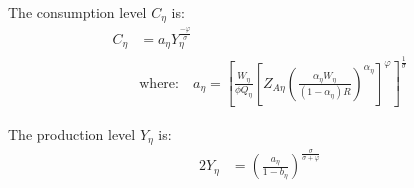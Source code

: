 \documentclass[../thesis.tex]{subfiles}
\begin{document}

The consumption level $C_{\eta}$ is:	
	\begin{align}
		C_{\eta} &= a_{\eta} Y_{\eta}^{\frac{-\varphi}{\sigma}} \label{eq_v2:reg-ss-consumption} \\
		& \text{where:} \quad a_{\eta} = \left[ \frac{W_{\eta}}{\phi Q_{\eta}} \left[ Z_{A\eta} \left( \frac{\alpha_{\eta} W_{\eta}}{(1 - \alpha_{\eta}) R} \right)^{\alpha_{\eta}} \right]^{\varphi} \right]^{\frac{1}{\sigma}}  \label{eq_v2:reg-ss-a-eta}
	\end{align}


The production level $Y_{\eta}$ is:
\begin{alignat}{2}
	Y_{\eta} &= \left( \frac{a_{\eta}}{1 - b_{\eta}} \right)^{\frac{\sigma}{\sigma + \varphi}} \label{eq_v2:reg-ss-yn}
\end{alignat}


\begin{comment}
	
	Substitute \ref{eq_v2:reg-ss-int-good-firm-FOC-Kt-2} in \ref{eq_v2:reg-ss-law-of-motion-for-capital}:
	\begin{align}
		I_{\eta} &= \delta K_{\eta} \implies I_{\eta} = \delta {\alpha_{\eta}} \frac{\Lambda_{}}{R_K} Y_{\eta} \implies \tag{\ref{eq_v2:reg-ss-law-of-motion-for-capital}} \\
		I_{\eta} &= b_{\eta} Y_{\eta} \label{eq_v2:reg-ss-investment} \\
		& \text{where:} \quad b_{\eta} = \delta {\alpha_{\eta}} \frac{\Lambda_{}}{R_K} \label{eq_v2:reg-ss-b-eta}
	\end{align}
	
\end{comment}

\end{document}
